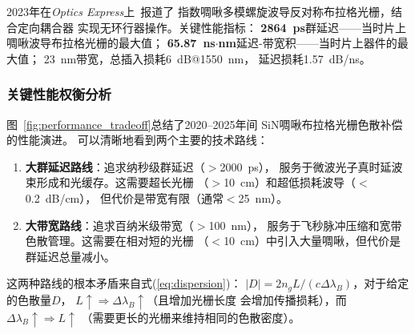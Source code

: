 \documentclass[12pt,a4paper,twoside]{article}
\begin{document}
2023年在\textit{Optics Express}上~\cite{li2023}报道了
指数啁啾多模螺旋波导反对称布拉格光栅，结合定向耦合器
实现无环行器操作。关键性能指标：
\textbf{2864~ps}群延迟——当时片上啁啾波导布拉格光栅的最大值；
\textbf{65.87~ns$\cdot$nm}延迟-带宽积——当时片上器件的最大值；
23~nm带宽，总插入损耗6~dB@1550~nm，
延迟损耗1.57~dB/ns。

\subsubsection{关键性能权衡分析}

图~\ref{fig:performance_tradeoff}总结了2020--2025年间
SiN啁啾布拉格光栅色散补偿的性能演进。
可以清晰地看到两个主要的技术路线：

\begin{enumerate}[leftmargin=*,itemsep=2pt]
\item \textbf{大群延迟路线}：追求纳秒级群延迟（$>$2000~ps），
  服务于微波光子真时延波束形成和光缓存。这需要超长光栅
  （$>$10~cm）和超低损耗波导（$<$\SI{0.2}{dB/cm}），
  但代价是带宽有限（通常$<$25~nm）。
\item \textbf{大带宽路线}：追求百纳米级带宽（$>$100~nm），
  服务于飞秒脉冲压缩和宽带色散管理。这需要在相对短的光栅
  （$<$\SI{10}{cm}）中引入大量啁啾，但代价是群延迟总量减小。
\end{enumerate}

这两种路线的根本矛盾来自式(\ref{eq:dispersion})：
$|D| = 2n_g L/(c\Delta\lambda_B)$，对于给定的色散量$D$，
$L \uparrow \Rightarrow \Delta\lambda_B \uparrow$（且增加光栅长度
会增加传播损耗），而$\Delta\lambda_B \uparrow \Rightarrow L \uparrow$
（需要更长的光栅来维持相同的色散密度）。
\end{document}
